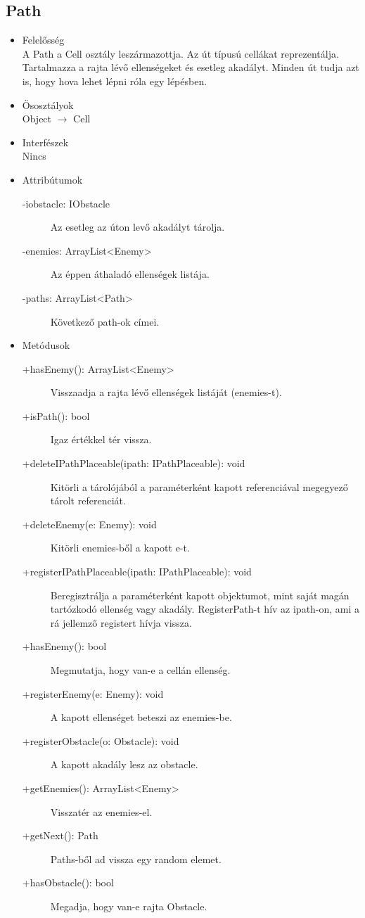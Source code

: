 \subsection{Path}
\begin{itemize}
\item Felelősség\\
A Path a Cell osztály leszármazottja. Az út típusú cellákat reprezentálja. Tartalmazza a rajta lévő ellenségeket és esetleg akadályt. Minden út tudja azt is, hogy hova lehet lépni róla egy lépésben.
\item Ősosztályok\\
Object $\rightarrow$ Cell
\item Interfészek\\
Nincs
\item Attribútumok\\
	\begin{description}
		\item[-iobstacle: IObstacle] Az esetleg az úton levő akadályt tárolja. 
		\item[-enemies: ArrayList<Enemy>] Az éppen áthaladó ellenségek listája. 
		\item[-paths: ArrayList<Path>] Következő path-ok címei. 

		
	\end{description}
\item Metódusok\\
	\begin{description}
		\item[+hasEnemy(): ArrayList<Enemy>] Visszaadja a rajta lévő ellenségek listáját (enemies-t). 
		\item[+isPath(): bool] Igaz értékkel tér vissza. 
		\item[+deleteIPathPlaceable(ipath: IPathPlaceable): void] Kitörli a tárolójából a paraméterként kapott referenciával megegyező tárolt referenciát. 
		\item[+deleteEnemy(e: Enemy): void] Kitörli enemies-ből a kapott e-t. 
		\item[+registerIPathPlaceable(ipath: IPathPlaceable): void] Beregisztrálja a paraméterként kapott objektumot, mint saját magán tartózkodó ellenség vagy akadály. RegisterPath-t hív az ipath-on, ami a rá jellemző registert hívja vissza. 
		\item[+hasEnemy(): bool] Megmutatja, hogy van-e a cellán ellenség. 
		\item[+registerEnemy(e: Enemy): void] A kapott ellenséget beteszi az enemies-be. 
		\item[+registerObstacle(o: Obstacle): void] A kapott akadály lesz az obstacle. 
		\item[+getEnemies(): ArrayList<Enemy>] Visszatér az enemies-el. 
		\item[+getNext(): Path] Paths-ből ad vissza egy random elemet. 
		\item[+hasObstacle(): bool] Megadja, hogy van-e rajta Obstacle.
		
		
	\end{description}
\end{itemize}

